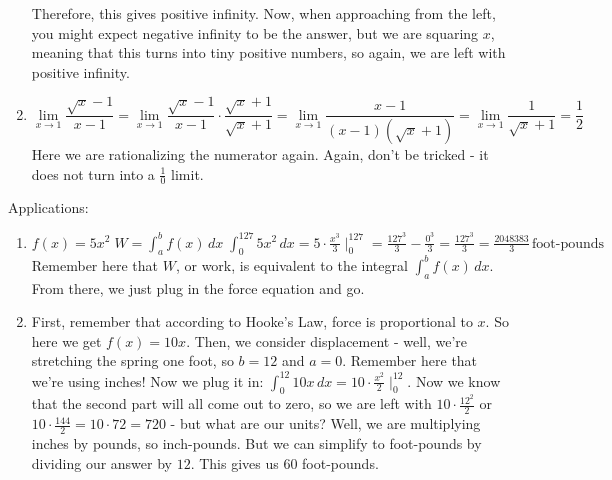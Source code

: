 \documentclass[12pt]{article}
\begin{document}
\begin{enumerate}
Therefore, this gives positive infinity. 
Now, when approaching from the left, you might expect negative infinity to be the answer, but we are squaring $x$, meaning that this turns into tiny positive numbers, so again, we are left with positive infinity.
\item \begin{equation*}
    \lim\limits_{x\rightarrow 1} \frac{\sqrt{x}-1}{x-1} = \lim\limits_{x\rightarrow 1} \frac{\sqrt{x}-1}{x-1} \cdot \frac{\sqrt{x}+1}{\sqrt{x}+1} = \lim\limits_{x\rightarrow 1} \frac{x-1}{(x-1)(\sqrt{x}+1)}=\lim\limits_{x\rightarrow 1} \frac{1}{\sqrt{x}+1} = \frac{1}{2}
\end{equation*}
Here we are rationalizing the numerator again. Again, don't be tricked - it does not turn into a $\frac{1}{0}$ limit.
\end{enumerate}

Applications:
\begin{enumerate}
\item $f(x) = 5x^2 \; W = \int^b_a f(x) \, dx \; \int^127_0 5x^2 \, dx = 5\cdot \frac{x^3}{3}\mid^{127}_0 = \frac{127^3}{3}-\frac{0^3}{3} = \frac{127^3}{3} = \frac{2048383}{3} \,\text{foot-pounds}$
Remember here that $W$, or work, is equivalent to the integral $\int^b_a f(x) \, dx$. From there, we just plug in the force equation and go.
\item First, remember that according to Hooke's Law, force is proportional to $x$. 
So here we get $f(x) = 10x$. 
Then, we consider displacement - well, we're stretching the spring one foot, so $b=12$ and $a = 0$. 
Remember here that we're using inches! 
Now we plug it in: $\int^{12}_0 10x \, dx = 10\cdot\frac{x^2}{2}\mid^{12}_0$. 
Now we know that the second part will all come out to zero, so we are left with $10\cdot\frac{12^2}{2}$ or $10\cdot\frac{144}{2} = 10\cdot 72 = 720$ - but what are our units? 
Well, we are multiplying inches by pounds, so inch-pounds. 
But we can simplify to foot-pounds by dividing our answer by $12$. This gives us $60$ foot-pounds.
\end{enumerate}
\end{document}
